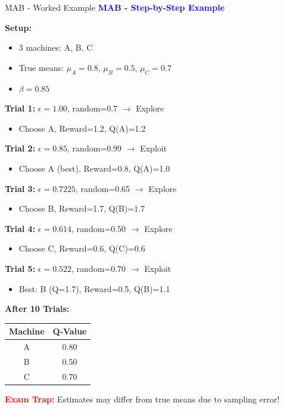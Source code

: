 \documentclass[8pt]{beamer}
\begin{document}
\begin{frame}{MAB - Worked Example}
\fontsize{6.5}{7.5}\selectfont
\textcolor{blue}{\textbf{MAB - Step-by-Step Example}}

\textbf{Setup:}
\begin{itemize}
\item 3 machines: A, B, C
\item True means: $\mu_A = 0.8$, $\mu_B = 0.5$, $\mu_C = 0.7$
\item $\beta = 0.85$
\end{itemize}

\textbf{Trial 1:} $\epsilon = 1.00$, random=0.7 $\rightarrow$ Explore
\begin{itemize}
\item Choose A, Reward=1.2, Q(A)=1.2
\end{itemize}

\textbf{Trial 2:} $\epsilon = 0.85$, random=0.99 $\rightarrow$ Exploit
\begin{itemize}
\item Choose A (best), Reward=0.8, Q(A)=1.0
\end{itemize}

\textbf{Trial 3:} $\epsilon = 0.7225$, random=0.65 $\rightarrow$ Explore
\begin{itemize}
\item Choose B, Reward=1.7, Q(B)=1.7
\end{itemize}

\textbf{Trial 4:} $\epsilon = 0.614$, random=0.50 $\rightarrow$ Explore
\begin{itemize}
\item Choose C, Reward=0.6, Q(C)=0.6
\end{itemize}

\textbf{Trial 5:} $\epsilon = 0.522$, random=0.70 $\rightarrow$ Exploit
\begin{itemize}
\item Best: B (Q=1.7), Reward=0.5, Q(B)=1.1
\end{itemize}

\textbf{After 10 Trials:}
\begin{tabular}{|c|c|}
\hline
Machine & Q-Value \\
\hline
A & 0.80 \\
\hline
B & 0.50 \\
\hline
C & 0.70 \\
\hline
\end{tabular}

\textcolor{red}{\textbf{Exam Trap:}} Estimates may differ from true means due to sampling error!
\end{frame}
\end{document}
